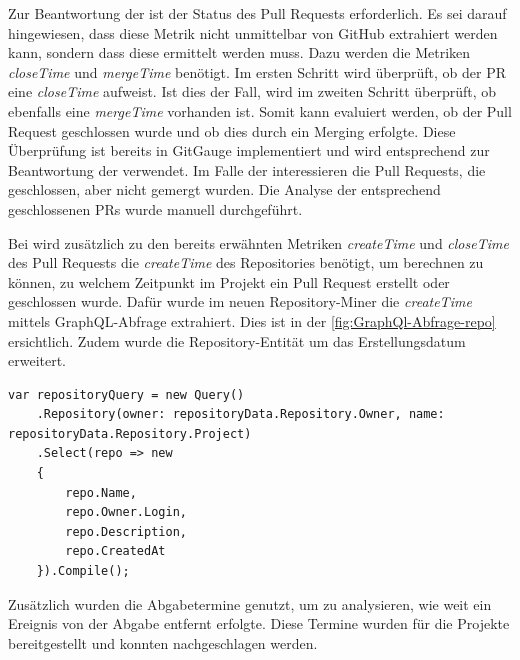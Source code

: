 Zur Beantwortung der  ist der Status des Pull Requests erforderlich. Es sei darauf hingewiesen, dass diese Metrik nicht unmittelbar von GitHub extrahiert werden kann, sondern dass diese ermittelt werden muss. Dazu werden die Metriken \textit{closeTime} und \textit{mergeTime} benötigt. Im ersten Schritt wird überprüft, ob der PR  eine \textit{closeTime} aufweist. Ist dies der Fall, wird im zweiten Schritt überprüft, ob ebenfalls eine \textit{mergeTime} vorhanden ist. Somit kann evaluiert werden, ob der Pull Request geschlossen wurde und ob dies durch ein Merging erfolgte. Diese Überprüfung ist bereits in GitGauge implementiert und wird entsprechend zur Beantwortung der  verwendet. Im Falle der  interessieren die Pull Requests, die geschlossen, aber nicht gemergt wurden. Die Analyse der entsprechend geschlossenen PRs wurde manuell durchgeführt.

Bei  wird zusätzlich zu den bereits erwähnten Metriken \textit{createTime} und \textit{closeTime} des Pull Requests die \textit{createTime} des Repositories benötigt, um berechnen zu können, zu welchem Zeitpunkt im Projekt ein Pull Request erstellt oder geschlossen wurde.  Dafür wurde im neuen Repository-Miner die \textit{createTime } mittels GraphQL-Abfrage extrahiert. Dies ist in der \autoref{fig:GraphQl-Abfrage-repo} ersichtlich. Zudem wurde die Repository-Entität um das Erstellungsdatum erweitert. 
\begin{lstlisting}[language=CSharp, caption={GraphQL-Abfrage Repository}]
var repositoryQuery = new Query()
    .Repository(owner: repositoryData.Repository.Owner, name: repositoryData.Repository.Project)
    .Select(repo => new
    {
        repo.Name,
        repo.Owner.Login,
        repo.Description,
        repo.CreatedAt
    }).Compile();
\end{lstlisting}

Zusätzlich wurden die Abgabetermine genutzt, um zu analysieren, wie weit ein Ereignis von der Abgabe entfernt erfolgte. Diese Termine wurden für die Projekte bereitgestellt und konnten nachgeschlagen werden.

